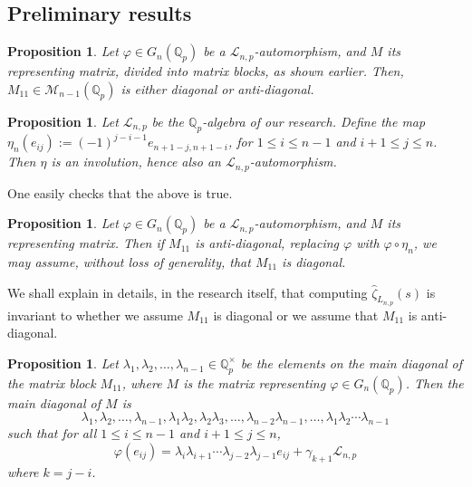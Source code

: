 \documentclass[12pt]{article}
\newtheorem{proposition}[theorem]{Proposition}
\begin{document}
\subsection{Preliminary results}
\label{preliminary.results}
\begin{proposition}
Let $\varphi\in{G_n(\mathbb{Q}_p)}$ be a $\mathcal{L}_{n,p}$-automorphism, and $M$ its representing matrix, divided into matrix blocks, as shown earlier. Then, $M_{11}\in\mathcal{M}_{n-1}(\mathbb{Q}_p)$ is either diagonal or anti-diagonal.
\end{proposition}
\begin{proposition}
Let $\mathcal{L}_{n,p}$ be the $\mathbb{Q}_p$-algebra of our research. Define the map $\eta_{n}(e_{ij}):=(-1)^{j-i-1}e_{n+1-j,n+1-i}$, for $1\leq{i}\leq{n-1}$ and ${i+1}\leq{j}\leq{n}$. Then $\eta$ is an involution, hence also an $\mathcal{L}_{n,p}$-automorphism.
\end{proposition}
One easily checks that the above is true.
\begin{proposition}
Let $\varphi\in{G_n(\mathbb{Q}_p)}$ be a $\mathcal{L}_{n,p}$-automorphism, and $M$ its representing matrix. Then if $M_{11}$ is anti-diagonal, replacing $\varphi$ with $\varphi\circ\eta_{n}$, we may assume, without loss of generality, that $M_{11}$ is diagonal.
\end{proposition}
We shall explain in details, in the research itself, that computing $\hat\zeta_{L_{n,p}}(s)$ is invariant to whether we assume $M_{11}$ is diagonal or we assume that $M_{11}$ is anti-diagonal. 
\begin{proposition}
\label{m.main.diagonal}
Let $\lambda_{1},\lambda_{2},\dots,\lambda_{n-1}\in\mathbb{Q}_{p}^{\times}$ be the elements on the main diagonal of the matrix block $M_{11}$, where $M$ is the matrix representing $\varphi\in{G}_n(\mathbb{Q}_p)$. Then the main diagonal of $M$ is \[\lambda_{1},\lambda_{2},\dots,\lambda_{n-1},\lambda_{1}\lambda_{2},\lambda_{2}\lambda_{3},\dots,\lambda_{n-2}\lambda_{n-1},\dots,\lambda_{1}\lambda_{2}\cdots\lambda_{n-1}\]
such that for all $1\leq{i}\leq{n-1}$ and ${i+1}\leq{j}\leq{n}$, \[\varphi(e_{ij})=\lambda_{i}\lambda_{i+1}\cdots\lambda_{j-2}\lambda_{j-1}e_{ij}+\gamma_{k+1}\mathcal{L}_{n,p}\]
where $k=j-i$.
\end{proposition}
\end{document}
